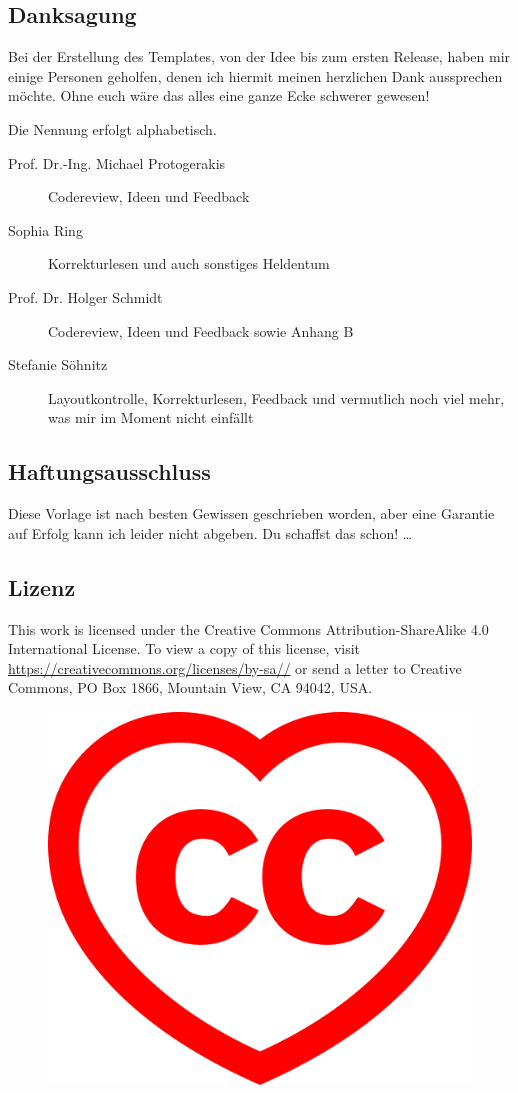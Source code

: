 \subsection{Danksagung}%
\label{sec:thx}
Bei der Erstellung des Templates, von der Idee bis zum ersten Release, haben mir einige Personen geholfen, denen ich hiermit meinen herzlichen Dank aussprechen möchte. Ohne euch wäre das alles eine ganze Ecke schwerer gewesen! 

Die Nennung erfolgt alphabetisch.
\begin{description}
  \item[Prof. Dr.-Ing. Michael Protogerakis] Codereview, Ideen und Feedback
  \item[Sophia Ring] Korrekturlesen und auch sonstiges Heldentum
  \item[Prof. Dr. Holger Schmidt] Codereview, Ideen und Feedback sowie Anhang B
  \item[Stefanie Söhnitz] Layoutkontrolle, Korrekturlesen, Feedback und ver\-mut\-lich noch viel mehr, was mir im Moment nicht einfällt
\end{description}%
\subsection{Haftungsausschluss}%
\label{sec:haftausschl}
Diese Vorlage ist nach besten Gewissen geschrieben worden, aber eine Garantie auf Erfolg kann ich leider nicht abgeben. Du schaffst das schon!
\dots%
\subsection{Lizenz}%
\label{sec:licence}
This work is licensed under the Creative Commons Attribution-ShareAlike 4.0 International License. To view a copy of this license, visit \href{https://creativecommons.org/licenses/by-sa/4.0/}{https://creativecommons.org/\-licenses/\-by-sa//} or send a letter to Creative Commons, PO Box 1866, Mountain View, CA 94042, USA.
\begin{figure}[hb]
  \centering
  \includegraphics[width=0.5\columnwidth]{graphics/ccheart_red.pdf}
\end{figure}%
